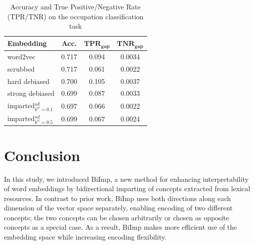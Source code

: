 \documentclass[11pt,a4paper]{article}
\def\proposedmethod{BiImp}
\begin{document}
\begin{table}
    \centering
	\begin{tabular}{lccc}
	    \hline \hline
        \textbf{Embedding} & \textbf{Acc.} & $\textbf{TPR}_{\textbf{gap}}$ & $\textbf{TNR}_{\textbf{gap}}$ \\\hline \hline %
        word2vec & 0.717 & 0.094 & 0.0034 \\
        scrubbed & 0.717 & 0.061 & 0.0022 \\
        hard debiased & 0.700 & 0.105 & 0.0037 \\
        strong debiased & 0.699 & 0.087 & 0.0033 \\
        imparted$_{k^w=0.1}^{sd}$ & 0.697 & 0.066 & 0.0022 \\
        imparted$_{k^w=0.5}^{sd}$ & 0.699 & 0.067 & 0.0024 \\
        \hline \hline
	\end{tabular}
	\caption{Accuracy and True Positive/Negative Rate
          (TPR/TNR) on the occupation classification task}
	\label{tab:biosbias}
\end{table}



\section{Conclusion} \label{sec:concl}

In this study, we introduced \proposedmethod{}, a new method for enhancing
interpretability of word embeddings by bidirectional
imparting of concepts extracted from lexical resources. 
In contrast to prior work, \proposedmethod{}
uses  both directions along each
dimension of the vector space separately, enabling encoding
of two different concepts; the two concepts can be chosen arbitrarily
or chosen as opposite concepts as a special case.  As a
result,
\proposedmethod{}
 makes more efficient use of
the embedding space while increasing encoding flexibility.

\end{document}
